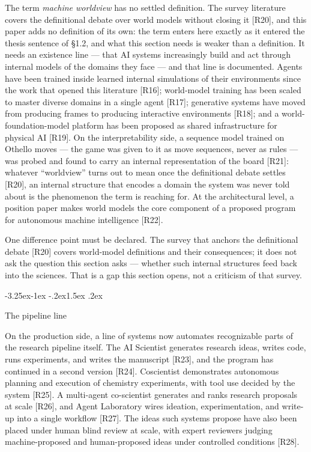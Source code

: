 \documentclass[11pt,a4paper]{article}
\makeatletter
\renewcommand\subsection{\@startsection{subsection}{2}{\z@}%
  {-3.25ex\@plus -1ex \@minus -.2ex}{1.5ex \@plus .2ex}%
  {\normalfont\large\bfseries\raggedright}}
\makeatother
\begin{document}
The term \textit{machine worldview} has no settled definition. The survey literature covers the definitional debate over world models without closing it [R20], and this paper adds no definition of its own: the term enters here exactly as it entered the thesis sentence of §1.2, and what this section needs is weaker than a definition. It needs an existence line — that AI systems increasingly build and act through internal models of the domains they face — and that line is documented. Agents have been trained inside learned internal simulations of their environments since the work that opened this literature [R16]; world-model training has been scaled to master diverse domains in a single agent [R17]; generative systems have moved from producing frames to producing interactive environments [R18]; and a world-foundation-model platform has been proposed as shared infrastructure for physical AI [R19]. On the interpretability side, a sequence model trained on Othello moves — the game was given to it as move sequences, never as rules — was probed and found to carry an internal representation of the board [R21]: whatever ``worldview'' turns out to mean once the definitional debate settles [R20], an internal structure that encodes a domain the system was never told about is the phenomenon the term is reaching for. At the architectural level, a position paper makes world models the core component of a proposed program for autonomous machine intelligence [R22].

One difference point must be declared. The survey that anchors the definitional debate [R20] covers world-model definitions and their consequences; it does not ask the question this section asks — whether such internal structures feed back into the sciences. That is a gap this section opens, not a criticism of that survey.

\subsection{The pipeline line}

On the production side, a line of systems now automates recognizable parts of the research pipeline itself. The AI Scientist generates research ideas, writes code, runs experiments, and writes the manuscript [R23], and the program has continued in a second version [R24]. Coscientist demonstrates autonomous planning and execution of chemistry experiments, with tool use decided by the system [R25]. A multi-agent co-scientist generates and ranks research proposals at scale [R26], and Agent Laboratory wires ideation, experimentation, and write-up into a single workflow [R27]. The ideas such systems propose have also been placed under human blind review at scale, with expert reviewers judging machine-proposed and human-proposed ideas under controlled conditions [R28].
\end{document}
